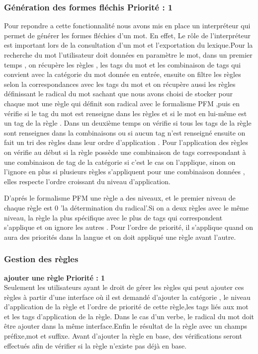 \documentclass[12pt,a4paper]{article}
\begin{document}
 \subsubsection{Génération des formes fléchis  Priorité : 1} 
Pour repondre a cette fonctionnalité nous avons mis en place un interpréteur qui permet de générer les formes fléchies d'un mot.
En effet, Le rôle de l'interpréteur est important lors de la consultation d'un mot et l'exportation du lexique.Pour la recherche du mot l'utilisateur doit données en paramètre le mot, dans un premier temps , on récupère les règles , les tags du mot et les combinaison de tags qui convient avec la catégorie du mot donnée en entrée, ensuite on filtre les règles selon la correspondances avec les tags du mot et on récupère aussi les règles définissant le radical du mot sachant que nous avons choisi de stocker pour chaque mot une règle qui définit son radical avec le formalisme PFM ,puis en vérifie si le tag du mot est renseigne dans les règles et si le mot en lui-même est un tag de la règle . 
Dans un deuxième temps on vérifie si tous les tags de la règle sont renseignes dans la combinaisons ou si aucun tag n'est renseigné ensuite on fait un tri des règles dans leur ordre d'application .
Pour l'application des règles on vérifie au début si la règle possède une combinaison de tags correspondant à une combinaison de tag de la catégorie si c'est le cas on l'applique, sinon on l'ignore en plus si plusieurs règles s'appliquent pour une combinaison données , elles respecte l'ordre croissant du niveau d'application.

 D'aprés le formalisme PFM une règle a des niveaux, et le premier niveau de chaque règle est 0 'la détermination du radical'.Si on a deux règles  avec le même niveau, la règle la plus spécifique avec le plus de tags qui correspondent s'applique et on ignore les autres . Pour l'ordre de priorité, il s'applique quand on aura des priorités dans la langue et on doit appliqué une règle avant l'autre. 
\subsubsection{Gestion des règles }
\textbf{ajouter une règle } \textbf{Priorité : 1} \\ Seulement les utilisateurs ayant le droit de gérer les règles qui peut ajouter ces règles à partir d'une interface où il est demandé d'ajouter la catégorie , le niveau d'application de la règle et l'ordre de priorité de cette règle,les tags liés aux mot et les tags d'application de la règle. Dans le cas d'un  verbe, le radical du mot doit être ajouter dans la même interface.Enfin le résultat de la règle avec un champs préfixe,mot et suffixe.
Avant d'ajouter la règle en base, des vérifications seront effectués afin  de vérifier si la règle n'existe pas déjà en base.
\end{document}
